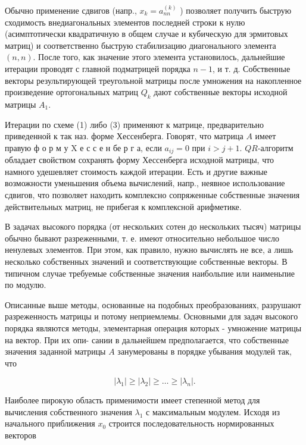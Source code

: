 \documentclass[10pt]{article}
\begin{document}
Обычно применение сдвигов (напр., $x_{k}=a_{n n}^{(k)}$ ) позволяет получить быструю сходимость внедиагональных элементов последней строки к нулю (асимптотически квадратичную в общем случае и кубическую для эрмитовых матриц) и соответственно быструю стабилизацию диагонального элемента $(n, n)$. После того, как значение этого элемента установилось, дальнейшие итерации проводят с главной подматрицей порядка $n-1$, и т. д. Собственные векторы результирующей треугольной матрицы после умножения на накопленное произведение ортогональных матриц $Q_{k}$ дают собственные векторы исходной матрицы $A_{1}$.



Итерации по схеме (1) либо (3) применяют к матрице, предварительно приведенной к так наз. форме Хессенберга. Говорят, что матрица $A$ имеет правую ф о р м у $\mathrm{X}$ е с с е н бе р г а, если $a_{i j}=0$ при $i>j+1$. $Q R$-алгоритм обладает свойством сохранять форму Хессенберга исходной матрицы, что намного удешевляет стоимость каждой итерации. Есть и другие важные возможности уменьшения объема вычислений, напр., неявное использование сдвигов, что позволяет находить комплексно сопряженные собственные значения действительных матриц, не прибегая к комплексной арифметике.



В задачах высокого порядка (от нескольких сотен до нескольких тысяч) матрицы обычно бывают разреженными, т. е. имеют относительно небольшое число ненулевых элементов. При этом, как правило, нужно вычислять не все, а лишь несколько собственных значений и соответствующие собственные векторы. В типичном случае требуемые собственные значения наибольпие или наименьпие по модулю.



Описанные выше методы, основанные на подобных преобразованиях, разрушают разреженность матрицы и потому неприемлемы. Основными для задач высокого порядка являются методы, элементарная операция которых - умножение матрицы на вектор. При их опи- сании в дальнейшем предполагается, что собственные значения заданной матрицы $A$ занумерованы в порядке убывания модулей так, что



\[

\left|\lambda_{1}\right| \geqslant\left|\lambda_{2}\right| \geqslant \ldots \geqslant\left|\lambda_{n}\right| .

\]



Наиболее пирокую область применимости имеет степенной метод для вычисления собственного значения $\lambda_{1}$ с максимальным модулем. Исходя из начального приближения $x_{0}$ строится последовательность нормированных векторов
\end{document}
